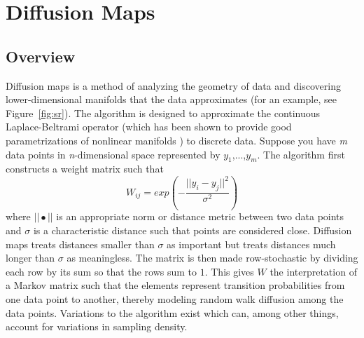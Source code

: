 \documentclass[12pt]{article}
\begin{document}
\section{Diffusion Maps}

\subsection{Overview} \label{DMO}

Diffusion maps is a method of analyzing the geometry of data and discovering lower-dimensional manifolds that the data approximates (for an example, see Figure~\ref{fig:sr}). The algorithm is designed to approximate the continuous Laplace-Beltrami operator (which has been shown to provide good parametrizations of nonlinear manifolds \cite{Jones2008}) to discrete data. Suppose you have \textit{m} data points in \textit{n}-dimensional space represented by $y_1$,...,$y_\textit{m}$. The algorithm first constructs a weight matrix such that\\
\[
W_{ij}=exp(-\frac{||y_i-y_j||^2}{\sigma ^2})
\]
where $|| \bullet ||$ is an appropriate norm or distance metric between two data points and $\sigma$ is a characteristic distance such that points are considered close. Diffusion maps treats distances smaller than $\sigma$ as important but treats distances much longer than $\sigma$ as meaningless. The matrix is then made row-stochastic by dividing each row by its sum so that the rows sum to $1$. This gives $W$ the interpretation of a Markov matrix such that the elements represent transition probabilities from one data point to another, thereby modeling random walk diffusion among the data points. Variations to the algorithm exist which can, among other things, account for variations in sampling density.\vspace{1mm}
\end{document}
